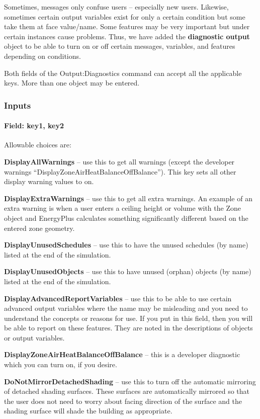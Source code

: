 Sometimes, messages only confuse users -- especially new users. Likewise, sometimes certain output variables exist for only a certain condition but some take them at face value/name. Some features may be very important but under certain instances cause problems. Thus, we have added the \textbf{diagnostic output} object to be able to turn on or off certain messages, variables, and features depending on conditions.

Both fields of the Output:Diagnostics command can accept all the applicable keys. More than one object may be entered.

\subsubsection{Inputs}\label{inputs-11-018}

\paragraph{Field: key1, key2}\label{field-key1-key2}

Allowable choices are:

\textbf{DisplayAllWarnings} -- use this to get all warnings (except the developer warnings ``DisplayZoneAirHeatBalanceOffBalance''). This key sets all other display warning values to on.

\textbf{DisplayExtraWarnings} -- use this to get all extra warnings. An example of an extra warning is when a user enters a ceiling height or volume with the Zone object and EnergyPlus calculates something significantly different based on the entered zone geometry.

\textbf{DisplayUnusedSchedules} -- use this to have the unused schedules (by name) listed at the end of the simulation.

\textbf{DisplayUnusedObjects} -- use this to have unused (orphan) objects (by name) listed at the end of the simulation.

\textbf{DisplayAdvancedReportVariables} -- use this to be able to use certain advanced output variables where the name may be misleading and you need to understand the concepts or reasons for use. If you put in this field, then you will be able to report on these features. They are noted in the descriptions of objects or output variables.

\textbf{DisplayZoneAirHeatBalanceOffBalance} -- this is a developer diagnostic which you can turn on, if you desire.

\textbf{DoNotMirrorDetachedShading} -- use this to turn off the automatic mirroring of detached shading surfaces. These surfaces are automatically mirrored so that the user does not need to worry about facing direction of the surface and the shading surface will shade the building as appropriate.

